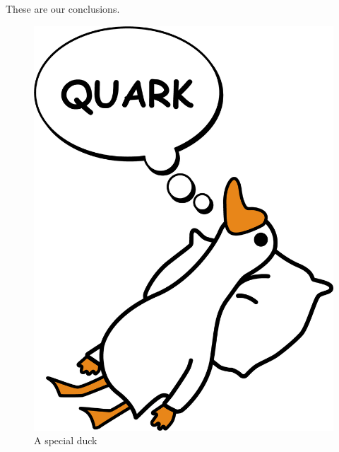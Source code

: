 These are our conclusions.

\begin{figure}
    \centering
    \includegraphics{Plots/DUCK_1.png}
    \caption{A special duck}
    \label{Fig:label}
\end{figure}
